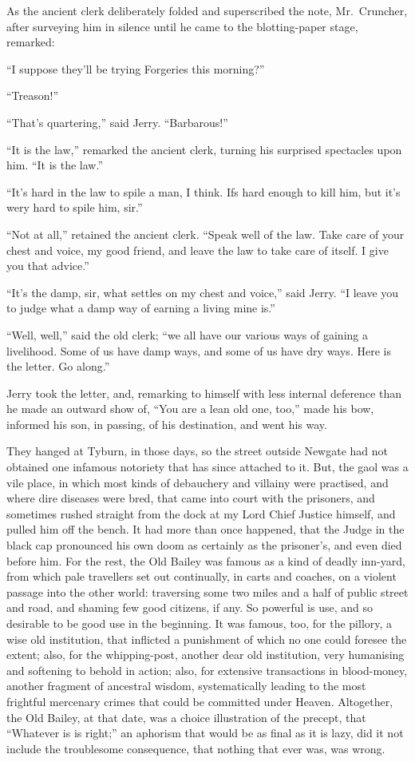 As the ancient clerk deliberately folded and superscribed the note,
Mr.\ Cruncher, after surveying him in silence until he came to the
blotting-paper stage, remarked:

``I suppose they'll be trying Forgeries this morning?''

``Treason!''

``That's quartering,'' said Jerry.  ``Barbarous!''

``It is the law,'' remarked the ancient clerk, turning his surprised
spectacles upon him.  ``It is the law.''

``It's hard in the law to spile a man, I think.  Ifs hard enough to
kill him, but it's wery hard to spile him, sir.''

``Not at all,'' retained the ancient clerk.  ``Speak well of the law.
Take care of your chest and voice, my good friend, and leave the law
to take care of itself.  I give you that advice.''

``It's the damp, sir, what settles on my chest and voice,'' said Jerry.
``I leave you to judge what a damp way of earning a living mine is.''

``Well, well,'' said the old clerk; ``we all have our various ways of
gaining a livelihood.  Some of us have damp ways, and some of us have
dry ways.  Here is the letter.  Go along.''

Jerry took the letter, and, remarking to himself with less internal
deference than he made an outward show of, ``You are a lean old one,
too,'' made his bow, informed his son, in passing, of his destination,
and went his way.

They hanged at Tyburn, in those days, so the street outside Newgate
had not obtained one infamous notoriety that has since attached to
it.  But, the gaol was a vile place, in which most kinds of
debauchery and villainy were practised, and where dire diseases were
bred, that came into court with the prisoners, and sometimes rushed
straight from the dock at my Lord Chief Justice himself, and pulled
him off the bench.  It had more than once happened, that the Judge in
the black cap pronounced his own doom as certainly as the prisoner's,
and even died before him.  For the rest, the Old Bailey was famous as
a kind of deadly inn-yard, from which pale travellers set out
continually, in carts and coaches, on a violent passage into the
other world:  traversing some two miles and a half of public street
and road, and shaming few good citizens, if any.  So powerful is use,
and so desirable to be good use in the beginning.  It was famous,
too, for the pillory, a wise old institution, that inflicted a
punishment of which no one could foresee the extent; also, for the
whipping-post, another dear old institution, very humanising and
softening to behold in action; also, for extensive transactions in
blood-money, another fragment of ancestral wisdom, systematically
leading to the most frightful mercenary crimes that could be
committed under Heaven.  Altogether, the Old Bailey, at that date,
was a choice illustration of the precept, that ``Whatever is is right;''
an aphorism that would be as final as it is lazy, did it not include
the troublesome consequence, that nothing that ever was, was wrong.

